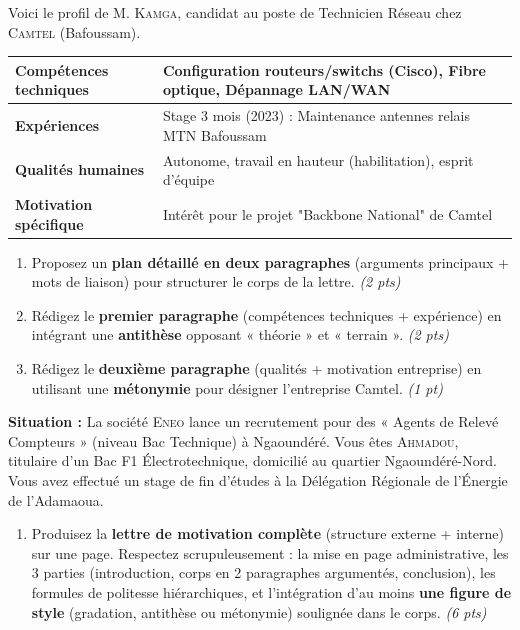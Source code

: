 \documentclass[11pt]{article}
\begin{document}
\begin{exercice}
Voici le profil de M. \textsc{Kamga}, candidat au poste de Technicien Réseau chez \textsc{Camtel} (Bafoussam).

\begin{center}
\begin{tabular}{|>{\raggedright\arraybackslash}p{5cm}|>{\raggedright\arraybackslash}p{11cm}|}
\hline
\textbf{Compétences techniques} & Configuration routeurs/switchs (Cisco), Fibre optique, Dépannage LAN/WAN \\ \hline
\textbf{Expériences} & Stage 3 mois (2023) : Maintenance antennes relais MTN Bafoussam \\ \hline
\textbf{Qualités humaines} & Autonome, travail en hauteur (habilitation), esprit d'équipe \\ \hline
\textbf{Motivation spécifique} & Intérêt pour le projet "Backbone National" de Camtel \\ \hline
\end{tabular}
\end{center}

\begin{enumerate}
    \item Proposez un \textbf{plan détaillé en deux paragraphes} (arguments principaux + mots de liaison) pour structurer le corps de la lettre. \textit{(2 pts)}

    \item Rédigez le \textbf{premier paragraphe} (compétences techniques + expérience) en intégrant une \textbf{antithèse} opposant « théorie » et « terrain ». \textit{(2 pts)}

    \item Rédigez le \textbf{deuxième paragraphe} (qualités + motivation entreprise) en utilisant une \textbf{métonymie} pour désigner l'entreprise Camtel. \textit{(1 pt)}
\end{enumerate}
\end{exercice}

\begin{exercice}
\textbf{Situation :} La société \textsc{Eneo} lance un recrutement pour des « Agents de Relevé Compteurs » (niveau Bac Technique) à Ngaoundéré. Vous êtes \textsc{Ahmadou}, titulaire d'un Bac F1 Électrotechnique, domicilié au quartier Ngaoundéré-Nord. Vous avez effectué un stage de fin d'études à la Délégation Régionale de l'Énergie de l'Adamaoua.

\begin{enumerate}
    \item Produisez la \textbf{lettre de motivation complète} (structure externe + interne) sur une page. Respectez scrupuleusement : la mise en page administrative, les 3 parties (introduction, corps en 2 paragraphes argumentés, conclusion), les formules de politesse hiérarchiques, et l'intégration d'au moins \textbf{une figure de style} (gradation, antithèse ou métonymie) soulignée dans le corps. \textit{(6 pts)}
\end{enumerate}
\end{exercice}
\end{document}
